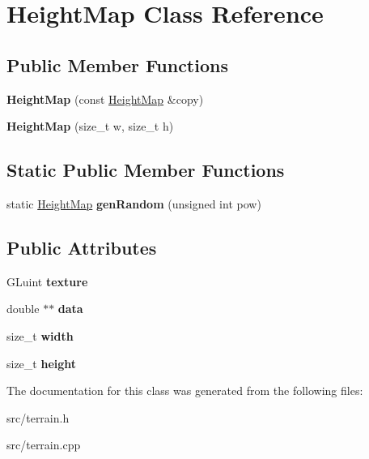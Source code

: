 \hypertarget{class_height_map}{}\section{Height\+Map Class Reference}
\label{class_height_map}
\subsection*{Public Member Functions}
\begin{DoxyCompactItemize}
\item 
\hypertarget{class_height_map_a32ace940baafd3dac7228b0949334891}{}{\bfseries Height\+Map} (const \hyperlink{class_height_map}{Height\+Map} \&copy)\label{class_height_map_a32ace940baafd3dac7228b0949334891}

\item 
\hypertarget{class_height_map_a7992f55c4c5c7fb453f89beb892a4fb8}{}{\bfseries Height\+Map} (size\+\_\+t w, size\+\_\+t h)\label{class_height_map_a7992f55c4c5c7fb453f89beb892a4fb8}

\end{DoxyCompactItemize}
\subsection*{Static Public Member Functions}
\begin{DoxyCompactItemize}
\item 
\hypertarget{class_height_map_acd1d7ed04f2e2ad0411378555c1b3c36}{}static \hyperlink{class_height_map}{Height\+Map} {\bfseries gen\+Random} (unsigned int pow)\label{class_height_map_acd1d7ed04f2e2ad0411378555c1b3c36}

\end{DoxyCompactItemize}
\subsection*{Public Attributes}
\begin{DoxyCompactItemize}
\item 
\hypertarget{class_height_map_a03f2518009888c748d122b1771dd0b8b}{}G\+Luint {\bfseries texture}\label{class_height_map_a03f2518009888c748d122b1771dd0b8b}

\item 
\hypertarget{class_height_map_aca9c8c47bce2ea134dd7206bdeef0040}{}double $\ast$$\ast$ {\bfseries data}\label{class_height_map_aca9c8c47bce2ea134dd7206bdeef0040}

\item 
\hypertarget{class_height_map_a674095275a539d9cbeffe7ba0ae36bcc}{}size\+\_\+t {\bfseries width}\label{class_height_map_a674095275a539d9cbeffe7ba0ae36bcc}

\item 
\hypertarget{class_height_map_a6640eb96152cb578ebc107e29207a35a}{}size\+\_\+t {\bfseries height}\label{class_height_map_a6640eb96152cb578ebc107e29207a35a}

\end{DoxyCompactItemize}


The documentation for this class was generated from the following files\+:\begin{DoxyCompactItemize}
\item 
src/terrain.\+h\item 
src/terrain.\+cpp\end{DoxyCompactItemize}
